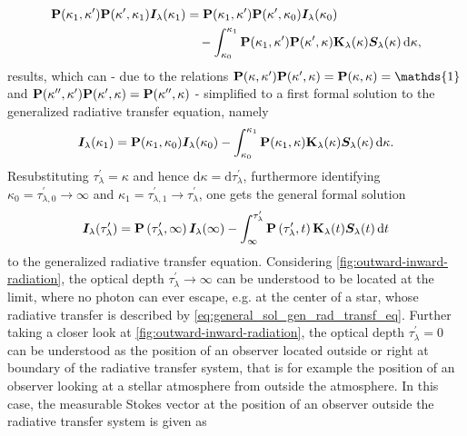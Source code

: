 \documentclass[a4paper,11pt]{report}
\def\fc#1{{\color{black}{#1}}} %
\begin{document}
\begin{align}
\begin{aligned}
\boldsymbol{\mathbf{P}}(\kappa_1,\kappa^\prime)\boldsymbol{\mathbf{P}}(\kappa^\prime,\kappa_1)\bm{I}_\lambda(\kappa_1) &= \boldsymbol{\mathbf{P}}(\kappa_1,\kappa^\prime)\boldsymbol{\mathbf{P}}(\kappa^\prime,\kappa_0)\bm{I}_\lambda(\kappa_0) \\
&\quad - \int_{\kappa_0}^{\kappa_1}\boldsymbol{\mathbf{P}}(\kappa_1,\kappa^\prime)\boldsymbol{\mathbf{P}}(\kappa^\prime,\kappa)\boldsymbol{\mathbf{K}}_\lambda(\kappa)\bm{S}_\lambda(\kappa)\,\mathrm{d}\kappa,
\end{aligned}
\end{align} results, which can - due to the relations $\matr{P}(\kappa,\kappa^\prime)\matr{P}(\kappa^\prime,\kappa) = \matr{P}(\kappa,\kappa) = \mathds{1}$ and $\boldsymbol{\mathbf{P}}(\kappa^{\prime\prime},\kappa^\prime)\boldsymbol{\mathbf{P}}(\kappa^\prime,\kappa) = \boldsymbol{\mathbf{P}}(\kappa^{\prime\prime},\kappa)$ - \fc{be further} simplified to a first formal solution to the generalized radiative transfer equation, namely \begin{equation}
\bm{I}_\lambda(\kappa_1) = \boldsymbol{\mathbf{P}}(\kappa_1,\kappa_0)\bm{I}_\lambda(\kappa_0)- \int_{\kappa_0}^{\kappa_1}\boldsymbol{\mathbf{P}}(\kappa_1,\kappa)\boldsymbol{\mathbf{K}}_\lambda(\kappa)\bm{S}_\lambda(\kappa)\,\mathrm{d}\kappa.
\end{equation} Resubstituting $\tau_\lambda^\prime = \kappa$ and hence $\mathrm{d}\kappa = \mathrm{d}\tau_\lambda^\prime$, furthermore identifying $\kappa_0 = \tau_{\lambda,0}^\prime \rightarrow \infty$ and $\kappa_1 = \tau_{\lambda,1}^\prime\rightarrow \tau_\lambda^\prime$, one gets the general formal solution \begin{align}\begin{aligned}\label{eq:general_sol_gen_rad_transf_eq}
\bm{I}_\lambda(\tau_\lambda^\prime) = \boldsymbol{\mathbf{P}}\left(\tau_\lambda^\prime,\infty\right)\bm{I}_\lambda(\infty)  -\int_{\infty}^{\tau_\lambda^\prime}\boldsymbol{\mathbf{P}}\left(\tau_\lambda^\prime,t\right)\boldsymbol{\mathbf{K}}_\lambda(t)\bm{S}_\lambda(t)\,\mathrm{d}t
\end{aligned}\end{align} to the generalized radiative transfer equation. Considering \cref{fig:outward-inward-radiation}, the optical depth $\tau_\lambda^\prime \rightarrow \infty$ can be understood to be located at the limit, where no photon can ever escape, e.g. at the center of a star, whose radiative transfer is described by \cref{eq:general_sol_gen_rad_transf_eq}. Further taking a closer look at \cref{fig:outward-inward-radiation}, the optical depth $\tau_\lambda^\prime = 0$ can be understood as the position of an observer located outside or right at boundary of the radiative transfer system, that is for example the position of an observer looking at a stellar atmosphere from outside the atmosphere. In this case, the measurable Stokes vector at the position of an observer outside the radiative transfer system is given as \begin{align}\begin{aligned}\label{eq:special_sol_gen_rad_transf_eq}

\end{aligned}
\end{align}
\end{document}
